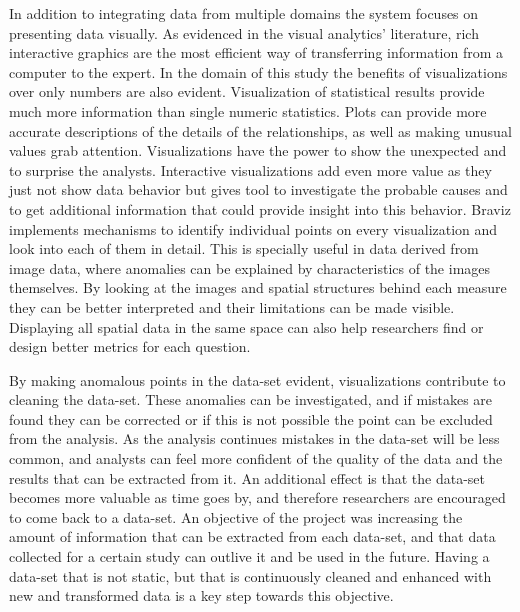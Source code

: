 In addition to integrating data from multiple domains the system focuses on presenting data visually. As evidenced in the visual analytics' literature, rich interactive graphics are the most efficient way of transferring information from a computer to the expert. In the domain of this study the benefits of visualizations over only numbers are also evident. Visualization of statistical results provide much more information than single numeric statistics. Plots can provide more accurate descriptions of the details of the relationships, as well as making unusual values grab attention. Visualizations have the power to show the unexpected and to surprise the analysts. Interactive visualizations add even more value as they just not show data behavior but gives tool to investigate the probable causes and to get additional information that could provide insight into this behavior. Braviz implements mechanisms to identify individual points on every visualization and look into each of them in detail. This is specially useful in data derived from image data, where anomalies can be explained by characteristics of the images themselves. By looking at the images and spatial structures behind each measure they can be better interpreted and their limitations can be made visible. Displaying all spatial data in the same space can also help researchers find or design better metrics for each question.

By making anomalous points in the data-set evident, visualizations contribute to cleaning the data-set. These anomalies can be investigated, and if mistakes are found they can be corrected or if this is not possible the point can be excluded from the analysis. As the analysis continues mistakes in the data-set will be less common, and analysts can feel more confident of the quality of the data and the results that can be extracted from it. An additional effect is that the data-set becomes more valuable as time goes by, and therefore researchers are encouraged to come back to a data-set. An objective of the project was increasing the amount of information that can be extracted from each data-set, and that data collected for a certain study can outlive it and be used in the future. Having a data-set that is not static, but that is continuously cleaned and enhanced with new and transformed data is a key step towards this objective.


